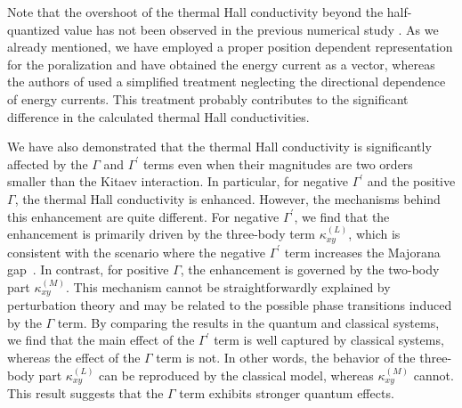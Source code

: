 \documentclass[twocolumn,superscriptaddress,showpacs, longbibliography, aps, prb]{revtex4-2}
\newcommand{\red}[1]{\textcolor{red}{#1}}
\newcommand{\blue}[1]{\textcolor{blue}{#1}}
\newcommand{\orange}[1]{\textcolor{orange}{#1}}
\begin{document}

Note that the overshoot of the thermal Hall conductivity beyond the half-quantized value has not been observed in the 
previous numerical study \cite{KumarT2023}. 
As we already mentioned, we have employed a proper position dependent representation for the poralization and have obtained the energy current as a vector, %
whereas the authors of %
\cite{KumarT2023} used a simplified treatment neglecting %
the directional dependence of energy currents. 
This treatment probably contributes to the significant difference in the calculated thermal Hall conductivities.


We %
have also demonstrated that the thermal Hall conductivity is significantly affected by 
the $\Gamma$ and $\Gamma^{\prime}$ terms even when their %
magnitudes are two orders %
smaller than the Kitaev interaction. 
In particular, %
for negative $\Gamma^{\prime}$
and the positive $\Gamma$, 
the thermal Hall conductivity is enhanced.
However, %
the mechanisms behind this enhancement are quite different.
For negative $\Gamma^{\prime}$, 
we find that the enhancement is primarily driven by the three-body term $\kappa_{xy}^{(L)}$, %
which is consistent with the scenario %
where the negative $\Gamma^{\prime}$ term increases the Majorana gap~\cite{Takikawa_PRB2020}.
In contrast, %
for %
positive $\Gamma$, %
the enhancement is governed by the two-body part $\kappa_{xy}^{(M)}$.
This mechanism %
cannot be straightforwardly explained by
perturbation theory
and may be related to the possible phase transitions induced by the $\Gamma$ term.
By comparing %
the results in the quantum and classical systems, 
we find that the main effect of the $\Gamma^{\prime}$ term %
is well captured by classical systems, 
whereas the effect of the $\Gamma$ term is not.
In other words, the behavior of the three-body part $\kappa_{xy}^{(L)}$ 
can be reproduced by the classical model, whereas $\kappa_{xy}^{(M)}$ cannot.
This result suggests that the $\Gamma$ term %
exhibits stronger quantum effects.
\end{document}
